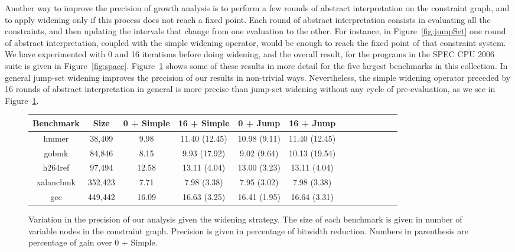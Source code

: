 \documentclass{llncs}
\begin{document}
Another way to improve the precision of growth analysis is to perform a few
rounds of abstract interpretation on the constraint graph, and to apply widening
only if this process does not reach a fixed point.
Each round of abstract interpretation consists in evaluating all the
constraints, and then updating the intervals that change from one evaluation to
the other.
For instance, in Figure~\ref{fig:jumpSet} one round of abstract interpretation,
coupled with the simple widening operator, would be enough to reach the
fixed point of that constraint system.
We have experimented with 0 and 16 iterations before doing widening, and the
overall result, for the programs in the SPEC CPU 2006 suite is given in
Figure~\ref{fig:space}.
Figure~\ref{fig:wideningPrec} shows some of these results in more detail
for the five largest benchmarks in this collection.
In general jump-set widening improves the precision of our results in
non-trivial ways.
Nevertheless, the simple widening operator preceded by 16 rounds of
abstract interpretation in general is more precise than jump-set widening
without any cycle of pre-evaluation, as we see in Figure~\ref{fig:wideningPrec}.

\begin{figure}[t!]
\begin{small}
\begin{center}
\renewcommand{\tabcolsep}{0.2cm}
\begin{tabular}{|c|c|c|c|c|c|c|c|c|c|c|c|c|} \hline
Benchmark &    Size & 0 + Simple &   16 + Simple &     0 + Jump & 16 + Jump \\ \hline
hmmer     &  38,409 &       9.98 & 11.40 (12.45) & 10.98 (9.11) & 11.40 (12.45) \\ \hline
gobmk     &  84,846 &       8.15 &  9.93 (17.92) &  9.02 (9.64) & 10.13 (19.54) \\ \hline
h264ref   &  97,494 &      12.58 &  13.11 (4.04) & 13.00 (3.23) & 13.11 (4.04) \\ \hline
xalancbmk & 352,423 &       7.71 &   7.98 (3.38) &  7.95 (3.02) & 7.98 (3.38) \\ \hline
gcc       & 449,442 &      16.09 &  16.63 (3.25) & 16.41 (1.95) & 16.64 (3.31) \\ \hline
\end{tabular}
\end{center}
\end{small}
\caption{\label{fig:wideningPrec}
Variation in the precision of our analysis given the widening strategy.
The size of each benchmark is given in number of variable nodes in the
constraint graph.
Precision is given in percentage of bitwidth reduction.
Numbers in parenthesis are percentage of gain over 0 + Simple.}
\end{figure}
\end{document}
